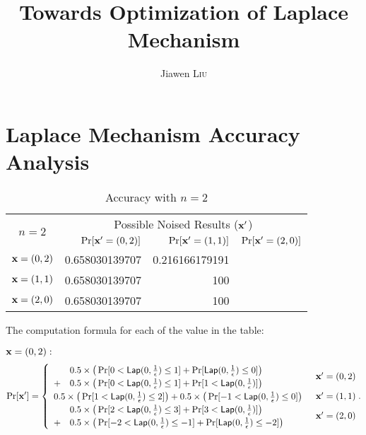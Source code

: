 \documentclass{article}
\begin{document}
\title{Towards Optimization of Laplace Mechanism}

\author{Jiawen \textsc{Liu}} %

\maketitle

\section{Laplace Mechanism Accuracy Analysis}
\label{sec_fullacc}
\begin{table}[htbp]
	\centering
	\caption{Accuracy with $n = 2$}
\begin{tabular}{|c|r|r|r|}
	\hline

	\multirow{2}{*}{$n = 2$} 	& \multicolumn{3}{c|}{Possible Noised Results ($\textbf{x}'$)}  \\ \cline{2-4}
	                      		&  $\Pr[\textbf{x}' = (0, 2)]$  	
	                      		&  $\Pr[\textbf{x}' = (1, 1)]$ 	
	                      		&  $\Pr[\textbf{x}' = (2, 0)]$ 	\\  \hline
	$\textbf{x} = (0,2)$          & 0.658030139707	& 0.216166179191	& \\  \hline
	$\textbf{x} = (1,1)$          & 0.658030139707	&  100 			& \\  \hline
	$\textbf{x} = (2,0)$          & 0.658030139707	&  100 			& \\  \hline
\end{tabular}
\end{table}

The computation formula for each of the value in the table:

\noindent $\textbf{x} = (0,2):$
\[
\Pr[\textbf{x}']
= \begin{cases}
\begin{array}{ll}
 	& 0.5 \times 
 	\big(
 	\Pr[	0	< \mathsf{Lap}(0, \frac{1}{\epsilon})	\leq	1] 
 	+ 
 	\Pr[	\mathsf{Lap}(0, \frac{1}{\epsilon})			\leq	0] 
 	\big) \\
 	+ 	
 	& 0.5 \times 
 	\big(
 	\Pr[	0	< \mathsf{Lap}(0, \frac{1}{\epsilon})	\leq	1] 
 	+ 
 	\Pr[	1 	< \mathsf{Lap}(0, \frac{1}{\epsilon})] 
 	\big) 
\end{array} 
	& \textbf{x}' = (0, 2)\\
\begin{array}{ll}
 	0.5 \times 
 	\big(
 	\Pr[	1	< \mathsf{Lap}(0, \frac{1}{\epsilon})	\leq	2] 
 	\big)
 	+ 	
 	0.5 \times 
 	\big(
 	\Pr[	-1	< \mathsf{Lap}(0, \frac{1}{\epsilon})	\leq	0] 
 	\big) 
\end{array}  
	& \textbf{x}' = (1, 1)\\
\begin{array}{ll}
 	& 0.5 \times 
 	\big(
 	\Pr[	2	<	\mathsf{Lap}(0, \frac{1}{\epsilon})	\leq	3] 
 	+ 
 	\Pr[	3	<	\mathsf{Lap}(0, \frac{1}{\epsilon})]
 	\big) \\
 	+ 	
 	& 0.5 \times 
 	\big(
 	\Pr[	-2	< \mathsf{Lap}(0, \frac{1}{\epsilon})	\leq	-1] 
 	+ 
 	\Pr[	\mathsf{Lap}(0, \frac{1}{\epsilon})			\leq	-2] 
 	\big) 
\end{array}  
& \textbf{x}' = (2, 0)
\end{cases}.
\]
\end{document}
